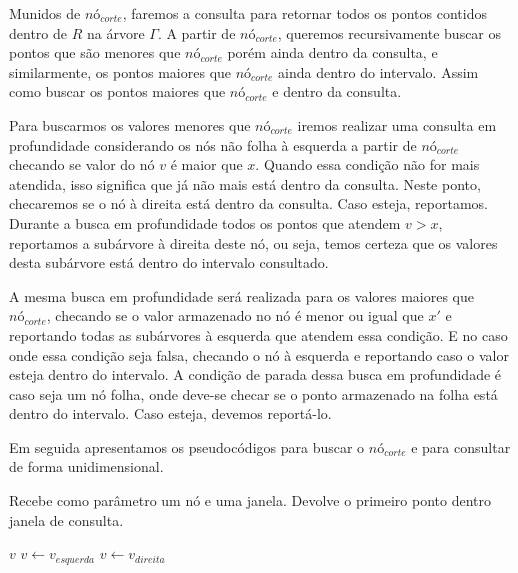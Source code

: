 Munidos de $nó_{corte}$, faremos a consulta para retornar todos os pontos contidos dentro de $R$ na árvore
$\Gamma$.
A partir de $nó_{corte}$, queremos recursivamente buscar os pontos que são menores que $nó_{corte}$ porém
ainda dentro da consulta, e similarmente, os pontos maiores que $nó_{corte}$ ainda dentro do intervalo.
Assim como buscar os pontos maiores que $nó_{corte}$ e dentro da consulta. \cite{cg_search1}

Para buscarmos os valores menores que $nó_{corte}$ iremos realizar uma consulta em profundidade considerando
os nós não folha à esquerda a partir de $nó_{corte}$ checando se valor do nó $v$ é maior que $x$. 
Quando essa condição não for mais atendida, %
isso significa que já não mais está
dentro da consulta. Neste ponto, checaremos se o nó à direita está dentro da consulta. Caso esteja, reportamos.
Durante a busca em profundidade todos os pontos que atendem $v > x$, reportamos a subárvore à direita
deste nó, ou seja, temos certeza que os valores desta subárvore está dentro do intervalo consultado.


A mesma busca em profundidade será realizada para os valores maiores que $nó_{corte}$, checando se 
o valor armazenado no nó é menor ou igual que $x'$ e reportando todas as subárvores à esquerda que atendem essa condição. E no caso onde essa condição seja falsa, checando o nó à esquerda e reportando caso o valor esteja dentro do intervalo. A condição de parada dessa busca em profundidade é caso seja um nó folha, onde deve-se checar
se o ponto armazenado na folha está dentro do intervalo. Caso esteja, devemos reportá-lo.

Em seguida apresentamos os pseudocódigos para buscar o $nó_{corte}$ e para consultar de forma unidimensional.

\begin{algorithm}[h!]
    \caption{Recebe como parâmetro um nó e uma janela. Devolve o primeiro ponto dentro janela de consulta.}
    \begin{algorithmic}[1]
            \Return $v$
        \Else
                \State $v \leftarrow v_{esquerda}$ 
            \Else
                \State $v \leftarrow v_{direita}$
            \EndIf
        \EndIf
        \EndWhile
    \EndFunction
    \end{algorithmic}
\end{algorithm}


